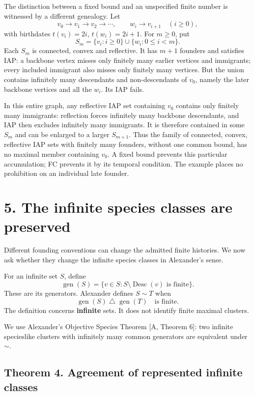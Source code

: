 \documentclass[
  11pt,
  letterpaper,
]{article}
\begin{document}
The distinction between a fixed bound and an unspecified finite number
is witnessed by a different genealogy. Let \[
 v_0\to v_1\to v_2\to\cdots,\qquad w_i\to v_{i+1}\quad(i\geq0),
\] with birthdates \(t(v_i)=2i\), \(t(w_i)=2i+1\). For \(m\geq0\), put
\[
 S_m=\{v_i:i\geq0\}\cup\{w_i:0\leq i<m\}.
\] Each \(S_m\) is connected, convex and reflective. It has \(m+1\)
founders and satisfies IAP: a backbone vertex misses only finitely many
earlier vertices and immigrants; every included immigrant also misses
only finitely many vertices. But the union contains infinitely many
descendants and non-descendants of \(v_0\), namely the later backbone
vertices and all the \(w_i\). Its IAP fails.

In this entire graph, any reflective IAP set containing \(v_0\) contains
only finitely many immigrants: reflection forces infinitely many
backbone descendants, and IAP then excludes infinitely many immigrants.
It is therefore contained in some \(S_m\) and can be enlarged to a
larger \(S_{m+1}\). Thus the family of connected, convex, reflective IAP
sets with finitely many founders, without one common bound, has no
maximal member containing \(v_0\). A fixed bound prevents this
particular accumulation; FC prevents it by its temporal condition. The
example places no prohibition on an individual late founder.

\section{5. The infinite species classes are
preserved}\label{the-infinite-species-classes-are-preserved}

Different founding conventions can change the admitted finite histories.
We now ask whether they change the infinite species classes in
Alexander's sense.

For an infinite set \(S\), define \[
 \operatorname{gen}(S)=
 \{v\in S:S\setminus\operatorname{Desc}(v)\text{ is finite}\}.
\] These are its generators. Alexander defines \(S\sim T\) when \[
          \operatorname{gen}(S)\mathbin{\triangle}
                   \operatorname{gen}(T)\quad\text{is finite}.
\] The definition concerns \textbf{infinite} sets. It does not identify
finite maximal clusters.

We use Alexander's Objective Species Theorem {[}A, Theorem 6{]}: two
infinite specieslike clusters with infinitely many common generators are
equivalent under \(\sim\).

\subsection{Theorem 4. Agreement of represented infinite
classes}\label{theorem-4.-agreement-of-represented-infinite-classes}
\end{document}
